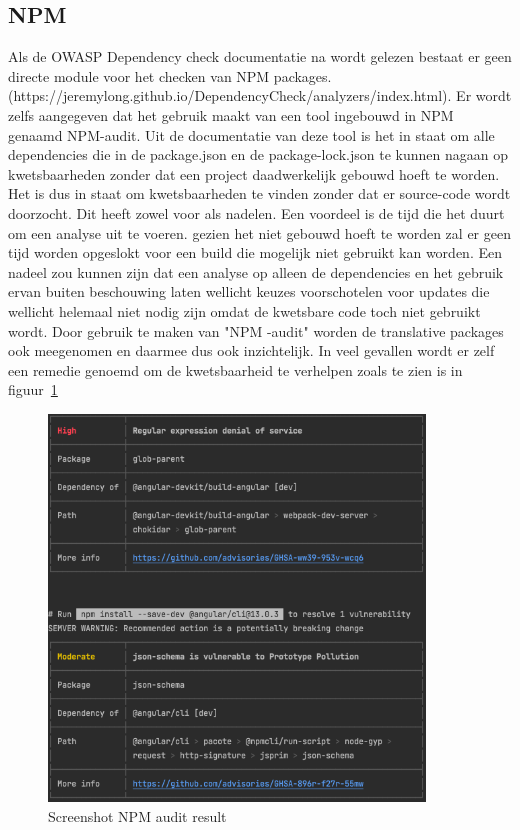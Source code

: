 \subsection{NPM}\label{subsec:npm}
Als de OWASP Dependency check documentatie na wordt gelezen bestaat er geen directe module voor het checken van NPM packages. (https://jeremylong.github.io/DependencyCheck/analyzers/index.html). Er wordt zelfs aangegeven dat het gebruik maakt van een tool ingebouwd in NPM genaamd NPM-audit.
Uit de documentatie van deze tool is het in staat om alle dependencies die in de package.json en de package-lock.json te kunnen nagaan op kwetsbaarheden zonder dat een project daadwerkelijk gebouwd hoeft te worden. Het is dus in staat om kwetsbaarheden te vinden zonder dat er source-code wordt doorzocht.
Dit heeft zowel voor als nadelen. Een voordeel is de tijd die het duurt om een analyse uit te voeren. gezien het niet gebouwd hoeft te worden zal er geen tijd worden opgeslokt voor een build die mogelijk niet gebruikt kan worden. Een nadeel zou kunnen zijn dat een analyse op alleen de dependencies en het gebruik ervan buiten beschouwing laten wellicht keuzes voorschotelen voor updates die wellicht helemaal niet nodig zijn omdat de kwetsbare code toch niet gebruikt wordt. Door gebruik te maken van "NPM -audit" worden de translative packages ook meegenomen en daarmee dus ook inzichtelijk. In veel gevallen wordt er zelf een remedie genoemd om de kwetsbaarheid te verhelpen zoals te zien is in figuur~\ref{fig:npmauditresult}
\begin{figure}[H]
    \centering
    \includegraphics[width=10cm]{gfx/Screenshot NPM audit}
    \caption{Screenshot NPM audit result}
    \label{fig:npmauditresult}
\end{figure}


